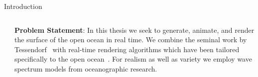 \documentclass[final,hyperref={pdfpagelabels=true}]{beamer}
\begin{document}
\begin{frame}
\begin{center}
\begin{minipage}{\textwidth}
\begin{block}{Introduction}
\begin{columns}[t]
\begin{column}{0.45\linewidth}
					
%				
				\end{column}
				\begin{column}{0.45\linewidth}
					\textbf{Problem Statement}:
					\nocite{course:simulatingocean,article:oceanlighting,article:whitecaps,thesis:johanson}
					In this thesis we seek to generate, animate, and render the surface of the
					open ocean in real time. We combine the seminal work by Tessendorf~\cite{course:simulatingocean}
					with real-time rendering algorithms which have been tailored specifically to
					the open ocean~\cite{article:oceanlighting,article:whitecaps,thesis:johanson}.
					For realism as well as variety we employ wave spectrum models from oceanographic research.

\end{column}
\end{columns}
\end{block}
\end{minipage}
\end{center}
\end{frame}
\end{document}
